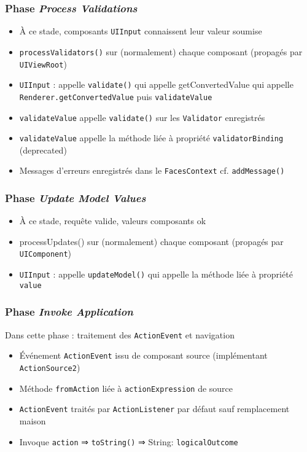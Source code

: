 \documentclass[english, french]{beamer}
\begin{document}
\begin{frame}[label=ph-pv-details]
	\frametitle{Phase \emph{Process Validations}}
	\begin{itemize}
		\item À ce stade, composants \texttt{UIInput} connaissent leur valeur soumise
		\item \texttt{processValidators()} sur {\tiny (normalement)} chaque composant (propagés par \texttt{UIViewRoot})
		\item \texttt{UIInput} : appelle {\tiny \texttt{validate()} qui appelle {getConvertedValue} qui appelle} \texttt{Renderer.getConvertedValue} puis \texttt{validateValue}
		\item \texttt{validateValue} appelle \texttt{validate()} sur les \texttt{Validator} enregistrés
		\item \texttt{validateValue} appelle la méthode liée à propriété \texttt{validatorBinding} (deprecated)
		\item Messages d’erreurs enregistrés dans le \texttt{FacesContext} {\tiny cf. \texttt{addMessage()}}
	\end{itemize}
\end{frame}

\begin{frame}[label=ph-umv-details]
	\frametitle{Phase \emph{Update Model Values}}
	\begin{itemize}
		\item À ce stade, requête valide, valeurs composants ok
		\item processUpdates() sur {\tiny (normalement)} chaque composant (propagés par \texttt{UIComponent})
		\item \texttt{UIInput} : appelle {\tiny \texttt{updateModel()} qui appelle} la méthode liée à propriété \texttt{value}
	\end{itemize}
\end{frame}

\begin{frame}[label=ph-ia-details]
	\frametitle{Phase \emph{Invoke Application}}
	Dans cette phase : traitement des \texttt{ActionEvent} et navigation
	\begin{itemize}
		\item Événement \texttt{ActionEvent} issu de composant \og{}source\fg{} {\tiny (implémentant \texttt{ActionSource2})}
		\item Méthode \texttt{fromAction} liée à \texttt{actionExpression} de \og{}source\fg{}
		\item \texttt{ActionEvent} traités par \texttt{ActionListener} par défaut {\tiny sauf remplacement maison}
		\item Invoque \texttt{action} {\tiny ⇒ \texttt{toString()}} ⇒ String: \texttt{logicalOutcome}
	\end{itemize}
\end{frame}
\end{document}
